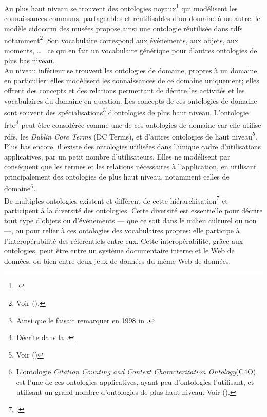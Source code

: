 Au plus haut niveau se trouvent des ontologies \og noyaux\fg{}\footcite[p.4]{isaac_les_2012} qui modélisent les connaissances communs, partageables et réutilisables d'un domaine à un autre: le modèle \ac{cidoccrm} des musées propose ainsi une ontologie réutilisée dans \ac{rdfs} notamment\footnote{Voir  ().}. Son vocabulaire correspond aux événements, aux objets, aux moments, \dots ~ ce qui en fait un vocabulaire générique pour d'autres ontologies de plus bas niveau.\\

Au niveau inférieur se trouvent les ontologies de domaine, propres à un domaine en particulier: elles modélisent les connaissances de ce domaine uniquement; elles offrent des concepts et des relations permettant de décrire les activités et les vocabulaires du domaine en question. Les concepts de ces ontologies de domaine sont souvent des spécialisations\footnote{Ainsi que le faisait remarquer  en 1998 in \cite{studer_knowledge_1998}.} d'ontologies de plus haut niveau. L'ontologie \ac{frbr}\footnote{Décrite dans la .} peut être considérée comme une de ces ontologies de domaine car elle utilise \ac{rdfs}, les \textit{Dublin Core Terms} (DC Terms), et d'autres ontologies de haut niveau\footnote{Voir  ()}.\\

Plus bas encore, il existe des ontologies utilisées dans l'unique cadre d'utilisations applicatives, par un petit nombre d'utilisateurs. Elles ne modélisent par conséquent que les termes et les relations nécessaires à l'application, en utilisant principalement des ontologies de plus haut niveau, notamment celles de domaine\footnote{L'ontologie \textit{Citation Counting and Context Characterization Ontology}(C4O) est l'une de ces ontologies applicatives, ayant peu d'ontologies l'utilisant, et utilisant un grand nombre d'ontologies de plus haut niveau. Voir  ().}.\\

De multiples ontologies existent et diffèrent de cette hiérarchisation\footcite[p.2]{isaac_les_2012} et participent à la diversité des ontologies. Cette diversité est essentielle pour décrire tout type d'objets ou d'événements --- que ce soit dans le milieu culturel ou non ---, ou pour relier à ces ontologies des vocabulaires propres: elle participe à l'interopérabilité des référentiels entre eux. Cette interopérabilité, grâce aux ontologies, peut être entre un système documentaire interne et le Web de données, ou bien entre deux jeux de données du même Web de données.

